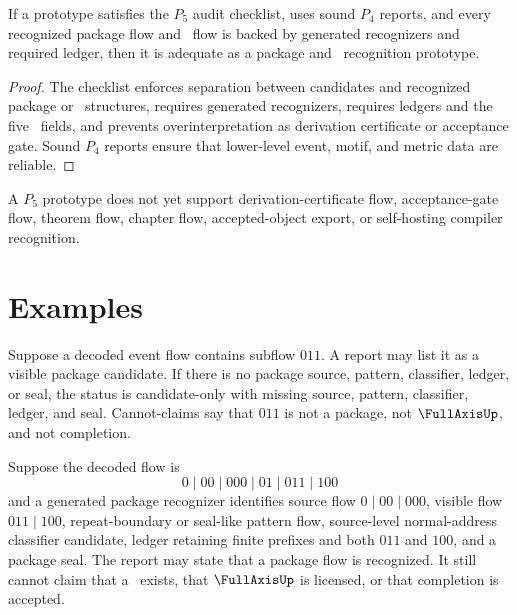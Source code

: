 \begin{theorem}
\label{thm:pkg-namecert-p5-adequacy}
If a prototype satisfies the $P_5$ audit checklist, uses sound $P_4$ reports, and every recognized package flow and \NameCert\ flow is backed by generated recognizers and required ledger, then it is adequate as a package and \NameCert\ recognition prototype.
\end{theorem}

\begin{proof}
The checklist enforces separation between candidates and recognized package or \NameCert\ structures, requires generated recognizers, requires ledgers and the five \NameCert\ fields, and prevents overinterpretation as derivation certificate or acceptance gate. Sound $P_4$ reports ensure that lower-level event, motif, and metric data are reliable.
\end{proof}

\begin{corollary}
\label{cor:pkg-namecert-p5-not-higher}
A $P_5$ prototype does not yet support derivation-certificate flow, acceptance-gate flow, theorem flow, chapter flow, accepted-object export, or self-hosting compiler recognition.
\end{corollary}

\section{Examples}
\label{sec:pkg-namecert-examples}

\begin{example}
\label{ex:pkg-namecert-package-candidate-no-ledger}
Suppose a decoded event flow contains subflow $011$. A report may list it as a visible package candidate. If there is no package source, pattern, classifier, ledger, or seal, the status is candidate-only with missing source, pattern, classifier, ledger, and seal. Cannot-claims say that $011$ is not a package, not $\FullAxisUp$, and not completion.
\end{example}

\begin{example}
\label{ex:pkg-namecert-package-over-completion}
Suppose the decoded flow is
$$
  0\mid 00\mid 000\mid 01\mid 011\mid 100
$$
and a generated package recognizer identifies source flow $0\mid 00\mid 000$, visible flow $011\mid 100$, repeat-boundary or seal-like pattern flow, source-level normal-address classifier candidate, ledger retaining finite prefixes and both $011$ and $100$, and a package seal. The report may state that a package flow is recognized. It still cannot claim that a \NameCert\ exists, that $\FullAxisUp$ is licensed, or that completion is accepted.
\end{example}

